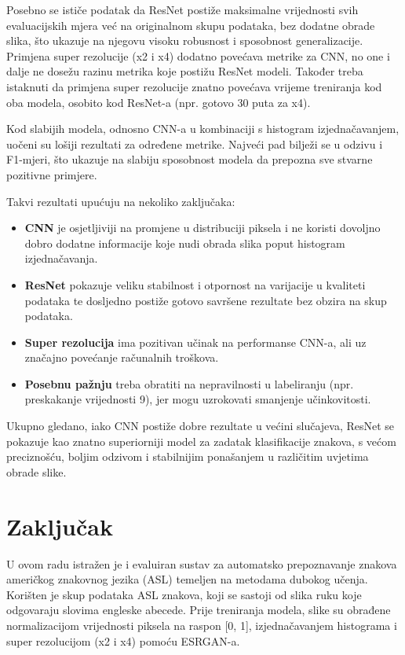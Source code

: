 \documentclass[a4paper,twocolumn]{article}
\begin{document}
Posebno se ističe podatak da ResNet postiže maksimalne vrijednosti svih evaluacijskih mjera već na originalnom skupu podataka, bez dodatne obrade slika, što ukazuje na njegovu visoku robusnost i sposobnost generalizacije. Primjena super rezolucije (x2 i x4) dodatno povećava metrike za CNN, no one i dalje ne dosežu razinu metrika koje postižu ResNet modeli. Također treba istaknuti da primjena super rezolucije znatno povećava vrijeme treniranja kod oba modela, osobito kod ResNet-a (npr. gotovo 30 puta za x4).

Kod slabijih modela, odnosno CNN-a u kombinaciji s histogram izjednačavanjem, uočeni su lošiji rezultati za određene metrike. Najveći pad bilježi se u odzivu i F1-mjeri, što ukazuje na slabiju sposobnost modela da prepozna sve stvarne pozitivne primjere.

Takvi rezultati upućuju na nekoliko zaključaka:

\begin{itemize}
\item \textbf{CNN} je osjetljiviji na promjene u distribuciji piksela i ne koristi dovoljno dobro dodatne informacije koje nudi obrada slika poput histogram izjednačavanja.
\item \textbf{ResNet} pokazuje veliku stabilnost i otpornost na varijacije u kvaliteti podataka te dosljedno postiže gotovo savršene rezultate bez obzira na skup podataka.
\item \textbf{Super rezolucija} ima pozitivan učinak na performanse CNN-a, ali uz značajno povećanje računalnih troškova.
\item \textbf{Posebnu pažnju} treba obratiti na nepravilnosti u labeliranju (npr. preskakanje vrijednosti 9), jer mogu uzrokovati smanjenje učinkovitosti.
\end{itemize}

Ukupno gledano, iako CNN postiže dobre rezultate u većini slučajeva, ResNet se pokazuje kao znatno superiorniji model za zadatak klasifikacije znakova, s većom preciznošću, boljim odzivom i stabilnijim ponašanjem u različitim uvjetima obrade slike.






\section{Zaključak}

U ovom radu istražen je i evaluiran sustav za automatsko prepoznavanje znakova američkog znakovnog jezika (ASL) temeljen na metodama dubokog učenja. Korišten je skup podataka ASL znakova, koji se sastoji od slika ruku koje odgovaraju slovima engleske abecede. Prije treniranja modela, slike su obrađene normalizacijom vrijednosti piksela na raspon [0, 1], izjednačavanjem histograma i super rezolucijom (x2 i x4) pomoću ESRGAN-a.
\end{document}

